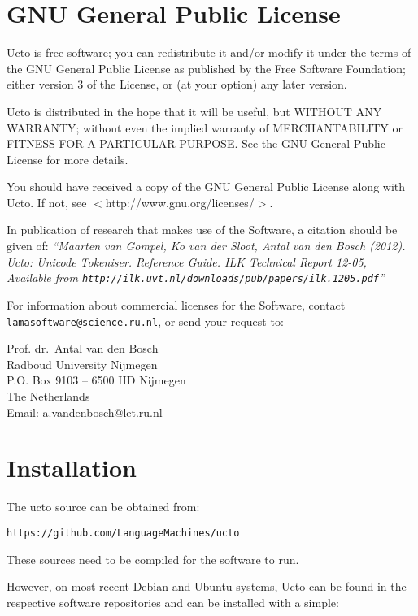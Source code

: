 \documentclass[a4paper,12pt]{report}
\begin{document}
\chapter{GNU General Public License}
\label{license}

Ucto is free software; you can redistribute it and/or modify it under the terms of the GNU General Public License as published by the Free
Software Foundation; either version 3 of the License, or (at your option) any later version.

Ucto is distributed in the hope that it will be useful, but WITHOUT ANY WARRANTY; without even the implied warranty of MERCHANTABILITY or FITNESS FOR A PARTICULAR PURPOSE.  See the GNU General Public License for more details.

You should have received a copy of the GNU General Public License along with Ucto.  If not, see $<$http://www.gnu.org/licenses/$>$.

In publication of research that makes use of the Software, a citation should be given of: {\em ``Maarten van Gompel, Ko van der Sloot, Antal van den Bosch (2012). Ucto: Unicode Tokeniser. Reference Guide. ILK Technical Report 12-05, \\ Available from {\tt http://ilk.uvt.nl/downloads/pub/papers/ilk.1205.pdf}''}

For information about commercial licenses for the Software, contact {\tt
lamasoftware@science.ru.nl}, or send your request to:

{\footnotesize
Prof. dr.~Antal van den Bosch\\
Radboud University Nijmegen \\
P.O. Box 9103  -- 6500 HD Nijmegen \\
The Netherlands \\
Email: a.vandenbosch@let.ru.nl}

\pagestyle{headings}

\chapter{Installation}
\vspace{-1cm}

The ucto source can be obtained from:

{\tt https://github.com/LanguageMachines/ucto}

These sources need to be compiled for the software to run.

However, on most recent Debian and Ubuntu systems, Ucto can be found in the respective software repositories and can be installed with a simple:
\end{document}

